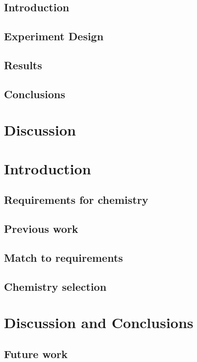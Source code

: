 \documentclass[]{report}
\begin{document}
\section{Introduction}
\section{Experiment Design}
\section{Results}
\section{Conclusions}

\chapter{Discussion}

\chapter{Introduction}
\section{Requirements for chemistry}
\section{Previous work}
\section{Match to requirements}
\section{Chemistry selection}

\chapter{Discussion and Conclusions}
\section{Future work}
\end{document}
